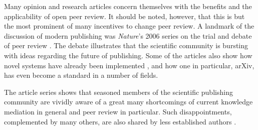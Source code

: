 Many opinion and research articles concern themselves with the benefits\cite{Leek2011,Mainguy2005} and the applicability\cite{vanRooyen1999,vanRooyen2010} of open peer review. 
It should be noted, however, that this is but the most prominent of many incentives to change peer review.
A landmark of the discussion of modern publishing was \textit{Nature}'s 2006 series on the trial and debate of peer review \cite{Nature-debate2006}.
The debate illustrates that the scientific community is bursting with ideas regarding the future of publishing. 
Some of the articles also show how novel systems have already been implemented \cite{Riley2006,Sandewall2006,Koop2006}, and how one in particular, arXiv\cite{arXiv}, has even become a standard in a number of fields.

The article series shows that seasoned members of the scientific publishing community are vividly aware of a great many shortcomings of current knowledge mediation in general and peer review in particular.
Such disappointments, complemented by many others, are also shared by less established authors \cite{Mainguy2005}.

